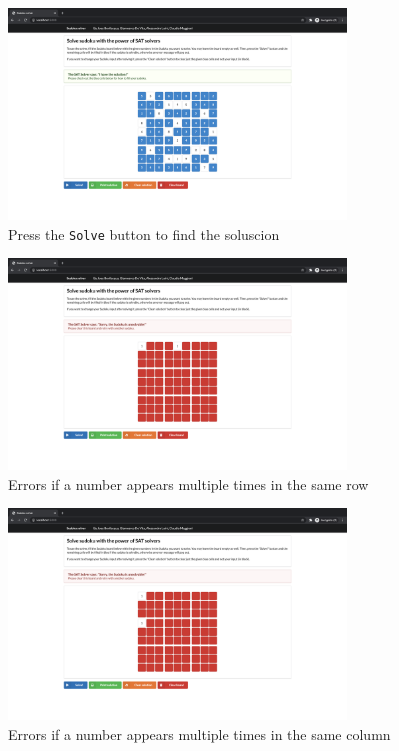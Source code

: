 \documentclass[]{usiinfprospectus}
\newcounter{row}
\newcounter{col}
\begin{document}
\begin{figure}[ht]
\centering
\includegraphics[width=0.8\textwidth]{pics/solved.png}
\caption{Press the \texttt{Solve} button to find the soluscion}
\end{figure}

\begin{figure}[ht]
\centering
\includegraphics[width=0.8\textwidth]{pics/row_check.png}
\caption{Errors if a number appears multiple times in the same row}
\end{figure}

\begin{figure}[ht]
\centering
\includegraphics[width=0.8\textwidth]{pics/column_check.png}
\caption{Errors if a number appears multiple times in the same column}
\end{figure}
\end{document}
